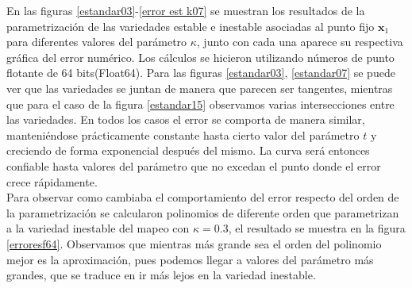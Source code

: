 En las figuras \ref{estandar03}-\ref{error est k07} se muestran los resultados de la parametrización de las variedades estable e inestable asociadas al punto fijo $\mathbf{x}_{1}$ para diferentes valores del parámetro $\kappa$, junto con cada una aparece su respectiva gráfica del error numérico.   Los cálculos se hicieron utilizando números de punto flotante de 64 bits(Float64). Para las figuras \ref{estandar03}, \ref{estandar07} se puede ver que las variedades se juntan de manera que parecen ser tangentes, mientras que para el caso de la figura \ref{estandar15} observamos varias intersecciones entre las variedades. En todos los casos el error se comporta de manera similar, manteniéndose prácticamente constante hasta cierto valor del parámetro $t$ y creciendo de forma exponencial después del mismo. La curva será entonces confiable hasta valores del parámetro que no excedan el punto donde el error crece rápidamente.  \\


Para observar como cambiaba el comportamiento del error respecto del orden de la parametrización se calcularon polinomios de diferente orden que parametrizan a la variedad inestable del mapeo con $\kappa=0.3$, el resultado se muestra en la figura \ref{erroresf64}. Observamos que mientras más grande sea el orden del polinomio mejor es la aproximación, pues podemos llegar a valores del parámetro más grandes, que se traduce en ir más lejos en la variedad inestable. \\

